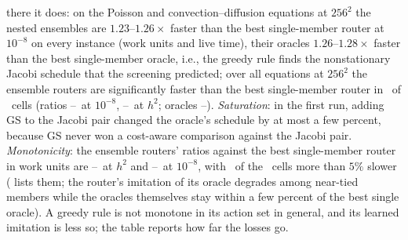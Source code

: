 there it does: on the Poisson and convection--diffusion equations at $256^2$ the nested ensembles are $1.23$--$1.26\times$ faster than the best single-member router at $10^{-8}$ on every instance (work units and live time), their oracles $1.26$--$1.28\times$ faster than the best single-member oracle, i.e., the greedy rule finds the nonstationary Jacobi schedule that the screening predicted; over all equations at $256^2$ the ensemble routers are significantly faster than the best single-member router in \caNestWinsB\ of \caNestNumB\ cells (ratios \caNestMinRatioB--\caNestMaxRatioB\ at $10^{-8}$, \caNestMinRatioHB--\caNestMaxRatioHB\ at $h^2$; oracles \caNestOrMinRatioB--\caNestOrMaxRatioB). \emph{Saturation}: in the first run, adding GS to the Jacobi pair changed the oracle's schedule by at most a few percent, because GS never won a cost-aware comparison against the Jacobi pair. \emph{Monotonicity}: the ensemble routers' ratios against the best single-member router in work units are \caNestMinRatioH--\caNestMaxRatioH\ at $h^2$ and \caNestMinRatio--\caNestMaxRatio\ at $10^{-8}$, with \caNestLosses\ of the \caNestNum\ cells more than $5\%$ slower ( lists them; the router's imitation of its oracle degrades among near-tied members while the oracles themselves stay within a few percent of the best single oracle). A greedy rule is not monotone in its action set in general, and its learned imitation is less so; the table reports how far the losses go.

\begin{table}[H]
\color{red}
\centering
\caption{Oracle-level screening of ensembles (confirmatory instances, seed $73$, with the compiled kernels' macro-action sizes): for every equation and grid, the fastest single solver and the fastest ensemble of up to three members under the cost-aware oracle (median work-unit time over $16$ test instances), at $\varepsilon = h^2$ and $10^{-8}$; the ratio is the speedup of the ensemble over the best single solver, and the last column is the ratio for $\{\text{Jacobi}, \text{Jacobi (0.67)}\}$.}
\resizebox{\textwidth}{!}{\caensscreen}
\label{tab:ca_ens_screen}
\end{table}

\begin{table}[H]
\color{red}
\centering
\caption{Nested ensembles: median time to $\varepsilon \in \{h^2, 10^{-6}, 10^{-8}\}$ of the learned router (live and work units) and of the cost-aware oracle (work units) over $\mathrm{NO}\cup\mathcal{W}$, for the single members and the nested two- and three-member sets, all evaluated in one session on the same instances ($64$ at $128^2$, $32$ at $256^2$, $16$ for anisotropic diffusion at $256^2$). The last columns give the paired speedup at $10^{-8}$ over the best single-member router (resp.\ oracle) with the two-sided Wilcoxon $p$-value; bold: $\ge 1.1\times$ and significant after a Holm correction over all tests of the table.}
\resizebox{\textwidth}{!}{\caensnest}
\label{tab:ca_ens_nest}
\end{table}



